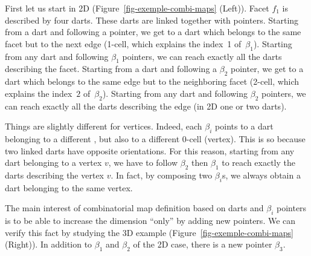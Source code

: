 First let us start in 2D (Figure~\ref{fig-exemple-combi-maps} (Left)).
Facet $f_1$ is described by four darts. These darts are linked
together with pointers. Starting from a dart and following a \betaun{} %
pointer, we get to a dart which belongs to the same facet but to the
next edge (1-cell, which explains the index~1 of~$\beta_1$).
Starting from any dart and following $\beta_1$ pointers, we can reach
exactly all the darts describing the facet.  Starting from a dart and
following a $\beta_2$ pointer, we get to a dart which belongs to the
same edge but to the neighboring facet (2-cell, which explains the
index~$2$ of~$\beta_2$).  Starting from any dart and following
$\beta_2$ pointers, we can reach exactly all the darts describing the
edge (in 2D one or two darts).

Things are slightly different for vertices.  Indeed, each $\beta_i$
points to a dart belonging to a different , but also to a
different 0-cell (vertex).  This is so because two linked darts have
opposite orientations.  For this reason, starting from any dart
belonging to a vertex $v$, we have to follow $\beta_2$ then $\beta_1$
to reach exactly the darts describing the vertex $v$.  In fact, by
composing two $\beta_i$s, we always obtain a dart belonging to the
same vertex.

The main interest of combinatorial map definition based on darts and
$\beta_i$ pointers is to be able to increase the dimension ``only'' by
adding new pointers. We can verify this fact by studying the 3D
example (Figure~\ref{fig-exemple-combi-maps} (Right)). In addition to
$\beta_1$ and $\beta_2$ of the 2D case, there is a new pointer
$\beta_3$.

